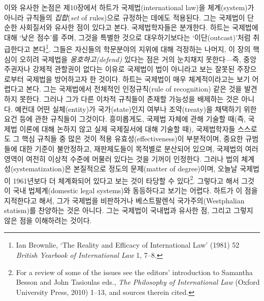 \documentclass[12pt, oneside]{book}  %
\begin{document}
이와 유사한 논점은 제10장에서 하트가 국제법(international law)을
체계(system)가 아니라 규칙들의 \emph{집합}(\emph{set} of rules)으로
규정하는 데에도 적용된다. 그는 국제법이 단순한 사회질서와 유사한 점이
있다고 본다. 국제법학자들은 분개한다. 하트는 국제법에 대해 `낮은 점수'를
주며, 그것을 특별한 것으로 대우하기보다는 `이단(outcast)'처럼 취급한다고
본다\footnote{Ian Brownlie, `The Reality and Efficacy of International
  Law' (1981) 52 \emph{British Yearbook of International Law} 1, 7--8.}.
그들은 자신들의 학문분야의 지위에 대해 걱정하는 나머지, 이 장의 핵심이
오히려 국제법을 \emph{옹호하고(defend)} 있다는 점은 거의 눈치채지
못한다---즉, 중앙 주권자나 강제적 관할권이 없다는 이유로 국제법이 법이
아니라고 보는 잘못된 주장으로부터 국제법을 방어하고자 한 것이다. 하트는
국제법이 매우 체계적이라고는 보기 어렵다고 본다. 그는 국제법에서
전체적인 인정규칙(rule of recognition) 같은 것을 발견하지 못한다. 그러나
그가 다른 이차적 규칙들이 존재할 가능성을 배제하는 것은 아니다. 예컨대
어떤 실체(entity)가 국가(state)인지 여부나 조약(treaty)을 채택하기 위한
요건 등에 관한 규칙들이 그것이다. 흥미롭게도, 국제법 자체에 관해 기술할
때(즉, 국제법 이론에 대해 논하지 않고 실제 국제질서에 대해 기술할 때),
국제법학자들 스스로도 그 핵심 규칙들 중 많은 것이 적용
유효성(effectiveness)이 부분적이며, 중요한 규범들에 대한 기준이
불안정하고, 재판제도들이 목적별로 분산되어 있으며, 국제법의 여러 영역이
여전히 이상적 수준에 머물러 있다는 것을 기꺼이 인정한다. 그러나 법의
체계성(systematization)은 본질적으로 정도의 문제(matter of degree)이며,
오늘날 국제법이 1961년보다 더 체계화되어 있다고 보는 것이 타당할 수
있다\footnote{For a review of some of the issues see the editors'
  introduction to Samantha Besson and John Tasioulas eds., \emph{The
  Philosophy of International Law} (Oxford University Press, 2010)
  1--13, and sources therein cited.}. 그렇다고 해서 그것이 국내
법체계(domestic legal systems)와 동등하다고 보기는 어렵다. 하트가 이
점을 지적한다고 해서, 그가 국제법을 비판하거나 베스트팔렌식
국가주의(Westphalian statism)를 찬양하는 것은 아니다. 그는 국제법이
국내법과 유사한 점, 그리고 그렇지 않은 점을 이해하려는 것이다.
\end{document}
